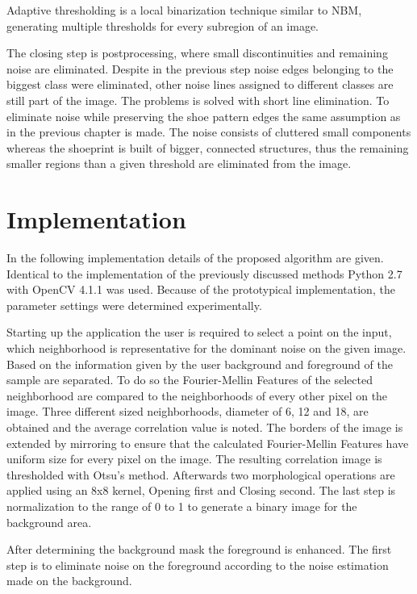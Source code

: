 \documentclass[draft,final]{vutinfth} %
\begin{document}
Adaptive thresholding is a local binarization technique similar to NBM, generating multiple thresholds for every subregion of an image.
\par
The closing step is postprocessing, where small discontinuities and remaining noise are eliminated.
Despite in the previous step noise edges belonging to the biggest class were eliminated, other noise lines assigned to different classes are still part of the image.
The problems is solved with short line elimination.
To eliminate noise while preserving the shoe pattern edges the same assumption as in the previous chapter is made.
The noise consists of cluttered small components whereas the shoeprint is built of bigger, connected structures, thus the remaining smaller regions than a given threshold are eliminated from the image.

\section{Implementation}
\par
In the following implementation details of the proposed algorithm are given.
Identical to the implementation of the previously discussed methods Python 2.7 \cite{van1995python} with OpenCV 4.1.1 \cite{opencv_library} was used.
Because of the prototypical implementation, the parameter settings were determined experimentally.
\par
Starting up the application the user is required to select a point on the input, which neighborhood is representative for the dominant noise on the given image.
Based on the information given by the user background and foreground of the sample are separated.
To do so the Fourier-Mellin Features of the selected neighborhood are compared to the neighborhoods of every other pixel on the image.
Three different sized neighborhoods, diameter of 6, 12 and 18, are obtained and the average correlation value is noted.
The borders of the image is extended by mirroring to ensure that the calculated Fourier-Mellin Features have uniform size for every pixel on the image.
The resulting correlation image is thresholded with Otsu's method.
Afterwards two morphological operations are applied using an 8x8 kernel, Opening first and Closing second.
The last step is normalization to the range of 0 to 1 to generate a binary image for the background area.
\par
After determining the background mask the foreground is enhanced.
The first step is to eliminate noise on the foreground according to the noise estimation made on the background.
\end{document}
